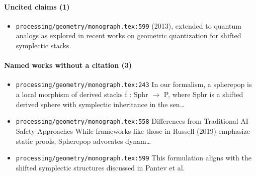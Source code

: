 \documentclass[11pt]{article}
\newcommand{\loc}[1]{{\small\color{muted}\texttt{#1}}}
\begin{document}
\paragraph{Uncited claims (1)}
\begin{itemize}
\item \loc{processing/\allowbreak{}geometry/\allowbreak{}monograph.tex:599} (2013), extended to quantum analogs as explored in recent works on geometric quantization for shifted symplectic stacks.
\end{itemize}
\paragraph{Named works without a citation (3)}
\begin{itemize}
\item \loc{processing/\allowbreak{}geometry/\allowbreak{}monograph.tex:243} In our formalism, a spherepop is a local morphism of derived stacks f : Sphr $\to$ P, where Sphr is a shifted derived sphere with symplectic inheritance in the sen\ldots{}
\item \loc{processing/\allowbreak{}geometry/\allowbreak{}monograph.tex:558} Differences from Traditional AI Safety Approaches While frameworks like those in Russell (2019) emphasize static proofs, Spherepop advocates dynam\ldots{}
\item \loc{processing/\allowbreak{}geometry/\allowbreak{}monograph.tex:599} This formulation aligns with the shifted symplectic structures discussed in Pantev et al.
\end{itemize}
\end{document}
